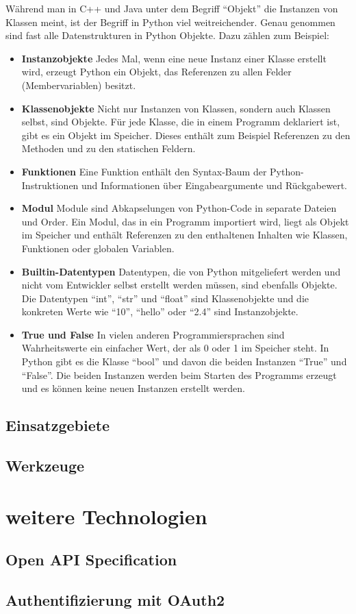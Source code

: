 		Während man in C++ und Java unter dem Begriff "`Objekt"' die Instanzen von Klassen meint, ist der Begriff in Python viel weitreichender. Genau genommen sind fast alle Datenstrukturen in Python Objekte. Dazu zählen zum Beispiel:
		\begin{itemize}
			\item \textbf{Instanzobjekte} Jedes Mal, wenn eine neue Instanz einer Klasse erstellt wird, erzeugt Python ein Objekt, das Referenzen zu allen Felder (Membervariablen) besitzt. 			
			\item \textbf{Klassenobjekte} Nicht nur Instanzen von Klassen, sondern auch Klassen selbst, sind Objekte. Für jede Klasse, die in einem Programm deklariert ist, gibt es ein Objekt im Speicher. Dieses enthält zum Beispiel Referenzen zu den Methoden und zu den statischen Feldern.
			\item \textbf{Funktionen} Eine Funktion enthält den Syntax-Baum der Python-Instruktionen und Informationen über Eingabeargumente und Rückgabewert.
			\item \textbf{Modul} Module sind Abkapselungen von Python-Code in separate Dateien und Order. Ein Modul, das in ein Programm importiert wird, liegt als Objekt im Speicher und enthält Referenzen zu den enthaltenen Inhalten wie Klassen, Funktionen oder globalen Variablen.
			\item \textbf{Builtin-Datentypen} Datentypen, die von Python mitgeliefert werden und nicht vom Entwickler selbst erstellt werden müssen, sind ebenfalls Objekte. Die Datentypen "`int"', "`str"' und "`float"' sind Klassenobjekte und die konkreten Werte wie "`10"', "`hello"' oder "`2.4"' sind Instanzobjekte.
			\item \textbf{True und False} In vielen anderen Programmiersprachen sind Wahrheitswerte ein einfacher Wert, der als 0 oder 1 im Speicher steht. In Python gibt es die Klasse "`bool"' und davon die beiden Instanzen "`True"' und "`False"'. Die beiden Instanzen werden beim Starten des Programms erzeugt und es können keine neuen Instanzen erstellt werden.
		\end{itemize}
		
	\subsection{Einsatzgebiete}
	\subsection{Werkzeuge}
	
\section{weitere Technologien}
	\subsection{Open API Specification}
	\subsection{Authentifizierung mit OAuth2}
	